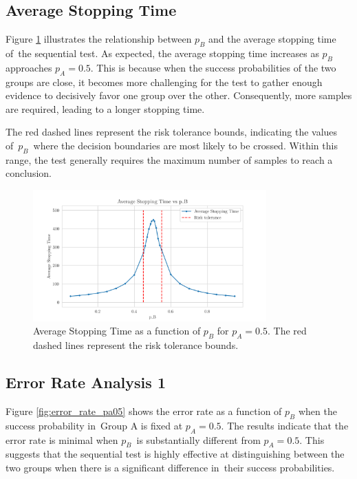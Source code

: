 \documentclass[magisterska, english]{pwr_wmat_praca_dyplomowa}
\theoremstyle{plain}
\numberwithin{theorem}{chapter}
\theoremstyle{definition}
\numberwithin{theorem}{chapter}
\begin{document}
\subsection{Average Stopping Time}

Figure \ref{fig:avg_stopping_time_pa05} illustrates the relationship between \( p_B \) and the average stopping time of~the sequential test. As expected, the average stopping time increases as \( p_B \) approaches \( p_A = 0.5 \). This is because when the success probabilities of the two groups are close, it becomes more challenging for the test to gather enough evidence to decisively favor one group over the other. Consequently, more samples are required, leading to a longer stopping time.

The red dashed lines represent the risk tolerance bounds, indicating the values of~\( p_B \)~where the decision boundaries are most likely to be crossed. Within this range, the test generally requires the maximum number of samples to reach a conclusion.
\begin{figure}[H]
	\centering
	\includegraphics[width=0.8\textwidth]{images/average_stopping_time_pa05.png}
	\caption{Average Stopping Time as a function of \( p_B \) for \( p_A = 0.5 \). The red dashed lines represent the risk tolerance bounds.}
	\label{fig:avg_stopping_time_pa05}
\end{figure}
\subsection{Error Rate Analysis 1}
Figure \ref{fig:error_rate_pa05} shows the error rate as a function of \( p_B \) when the success probability in~Group A is fixed at \( p_A = 0.5 \). The results indicate that the error rate is minimal when \( p_B \)~is substantially different from \( p_A = 0.5 \). This suggests that the sequential test is highly effective at distinguishing between the two groups when there is a significant difference in~their success probabilities.
\end{document}
